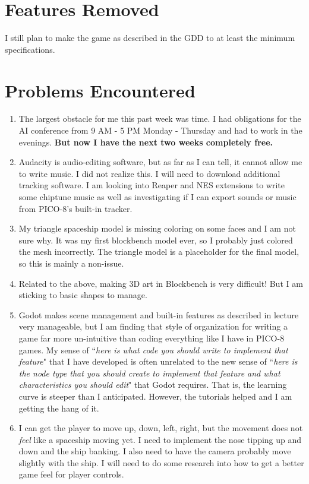 \documentclass[journal]{IEEEtran}
\begin{document}
\section{Features Removed}

I still plan to make the game as described in the GDD to at least the minimum specifications.
\section{Problems Encountered}

\begin{enumerate}
    \item The largest obstacle for me this past week was time. I had obligations for the AI conference from 9 AM - 5 PM Monday - Thursday and had to work in the evenings. \textbf{But now I have the next two weeks completely free.}
    \item Audacity is audio-editing software, but as far as I can tell, it cannot allow me to write music. I did not realize this. I will need to download additional tracking software. I am looking into Reaper and NES extensions to write some chiptune music as well as investigating if I can export sounds or music from PICO-8's built-in tracker. 
    \item My triangle spaceship model is missing coloring on some faces and I am not sure why. It was my first blockbench model ever, so I probably just colored the mesh incorrectly. The triangle model is a placeholder for the final model, so this is mainly a non-issue. 
    \item Related to the above, making 3D art in Blockbench is very difficult! But I am sticking to basic shapes to manage.
    \item Godot makes scene management and built-in features as described in lecture very manageable, but I am finding that style of organization for writing a game far more un-intuitive than coding everything like I have in PICO-8 games. My sense of ``\emph{here is what code you should write to implement that feature}" that I have developed is often unrelated to the new sense of ``\emph{here is the node type that you should create to implement that feature and what characteristics you should edit}" that Godot requires. That is, the learning curve is steeper than I anticipated. However, the tutorials helped and I am getting the hang of it. 
    \item I can get the player to move up, down, left, right, but the movement does not \emph{feel} like a spaceship moving yet. I need to implement the nose tipping up and down and the ship banking. I also need to have the camera probably move slightly with the ship. I will need to do some research into how to get a better game feel for player controls.
\end{enumerate}
\end{document}
